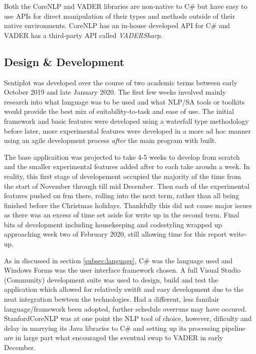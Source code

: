 \documentclass{article}
\begin{document}
        Both the CoreNLP and VADER libraries are non-native to C\# but have easy to use APIs for direct manipulation of their types and methods outside of their native environments. CoreNLP has an in-house developed API for C\# and VADER has a third-party API called \emph{VADERSharp}.
    \subsection{Design \& Development}
    \label{subsec:dnd}
        Sentiplot was developed over the course of two academic terms between early October 2019 and late January 2020. The first few weeks involved mainly research into what language was to be used and what NLP/SA tools or toolkits would provide the best mix of suitability-to-task and ease of use. The initial framework and basic features were developed using a waterfall type methodology before later, more experimental features were developed in a more ad hoc manner using an agile development process \emph{after} the main program with built.
        
        The base applicaition was projected to take 4-5 weeks to develop from scratch and the smaller experimental features added after to each take aroudn a week. In reality, this first stage of developement occupied the majority of the time from the start of November through till mid December. Then each of the experimental features pushed on frm there, rolling into the next term, rather than all being finished before the Christmas holidays. Thankfully this did not cause major issues as there was an excess of time set aside for write up in the second term. Final bits of development including housekeeping and codestyling wrapped up approaching week two of February 2020, still allowing time for this report write-up.

        As in discussed in section \ref{subsec:language}, C\# was the language used and Windows Forms was the user interface framework chosen. A full Visual Studio (Community) development suite was used to design, build and test the application which allowed for relatively switft and easy development due to the neat integration bewteen the technologies. Had a different, less familair language/framework been adopted, further schedule overruns may have occured. StanfordCoreNLP was at one point the NLP tool of choice, however, dificulty and delay in marrying its Java libraries to C\# and setting up its processing pipeline are in large part what encouraged the eventual swap to VADER in early December.
        
\end{document}
